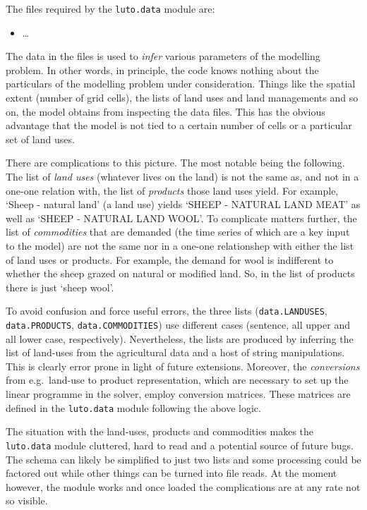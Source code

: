 \documentclass{draft}
\begin{document}
The files required by the \texttt{luto.data} module are:
\begin{itemize}
	\item \ldots
\end{itemize}

The data in the files is used to \emph{infer} various parameters of the modelling problem. In other words, in principle, the code knows nothing about the particulars of the modelling problem under consideration. Things like the spatial extent (number of grid cells), the lists of land uses and land managements and so on, the model obtains from inspecting the data files. This has the obvious advantage that the model is not tied to a certain number of cells or a particular set of land uses.

There are complications to this picture. The most notable being the following. The list of \emph{land uses} (whatever lives on the land) is not the same as, and not in a one-one relation with, the list of \emph{products} those land uses yield. For example, `Sheep - natural land' (a land use) yields `SHEEP - NATURAL LAND MEAT' as well as `SHEEP - NATURAL LAND WOOL'. To complicate matters further, the list of \emph{commodities} that are demanded (the time series of which are a key input to the model) are not the same nor in a one-one relationshep with either the list of land uses or products. For example, the demand for wool is indifferent to whether the sheep grazed on natural or modified land. So, in the list of products there is just `sheep wool'.

To avoid confusion and force useful errors, the three lists (\texttt{data.LANDUSES}, \texttt{data.PRODUCTS}, \texttt{data.COMMODITIES}) use different cases (sentence, all upper and all lower case, respectively). Nevertheless, the lists are produced by inferring the list of land-uses from the agricultural data and a host of string manipulations. This is clearly error prone in light of future extensions. Moreover, the \emph{conversions} from e.g.\ land-use to product representation, which are necessary to set up the linear programme in the solver, employ conversion matrices. These matrices are defined in the \texttt{luto.data} module following the above logic.

The situation with the land-uses, products and commodities makes the \texttt{luto.data} module cluttered, hard to read and a potential source of future bugs. The schema can likely be simplified to just two lists and some processing could be factored out while other things can be turned into file reads. At the moment however, the module works and once loaded the complications are at any rate not so visible.
\end{document}

